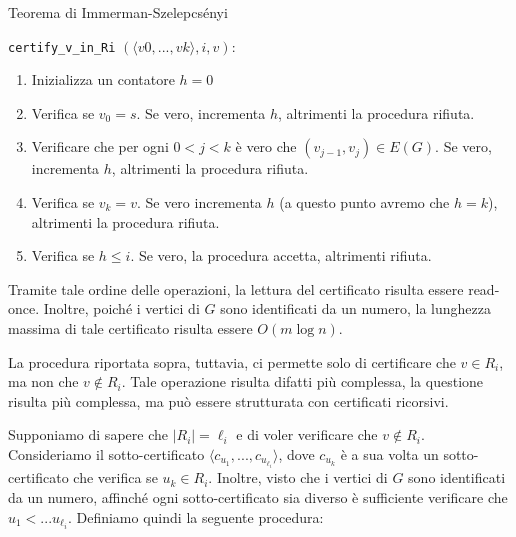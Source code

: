 \begin{Thm}{Teorema di Immerman-Szelepcsényi}{}
\begin{demonstration}
\texttt{certify\_v\_in\_Ri} $(\langle v0, . . . , vk\rangle, i, v)$:
\begin{enumerate}
    \item Inizializza un contatore $h = 0$
    \item Verifica se $v_0 = s$. Se vero, incrementa $h$, altrimenti la procedura rifiuta.
    \item Verificare che per ogni $0 < j < k$ è vero che $(v_{j-1}, v_j)\in E(G)$. Se vero, incrementa $h$, altrimenti la procedura rifiuta.
    \item Verifica se $v_k = v$. Se vero incrementa $h$ (a questo punto avremo che $h = k$), altrimenti la procedura rifiuta.
    \item Verifica se $h\leq i$. Se vero, la procedura accetta, altrimenti rifiuta.
\end{enumerate}
Tramite tale ordine delle operazioni, la lettura del certificato risulta essere read-once. Inoltre, poiché i vertici di $G$ sono identificati da un numero, la lunghezza
massima di tale certificato risulta essere $O(m\log n)$.

La procedura riportata sopra, tuttavia, ci permette solo di certificare che $v\in R_i$, ma non che $v\notin R_i$. Tale operazione risulta difatti più complessa, la questione risulta più complessa, ma può essere strutturata con certificati ricorsivi.

Supponiamo di sapere che $|R_i| = \ell_i$ e di voler verificare che $v\notin R_i$. Consideriamo il
sotto-certificato $\langle c_{u_1},..., c_{u_{\ell_i}}\rangle$, dove $c_{u_k}$ è a sua volta un sotto-certificato che verifica se $u_k\in R_i$. Inoltre, visto che i vertici di $G$ sono identificati da un numero, affinché ogni sotto-certificato sia diverso è sufficiente verificare che $u_1 < ... u_{\ell_i}$. Definiamo quindi la seguente procedura:


\end{demonstration}
\end{Thm}
